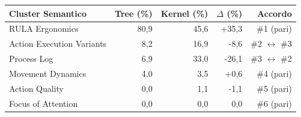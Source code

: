 \begin{tabular*}{\linewidth}{@{}l@{\extracolsep{\fill}}rrrr@{}}
\toprule
\textbf{Cluster Semantico} & \textbf{Tree (\%)} & \textbf{Kernel (\%)} & \textbf{$\Delta$ (\%)} & \textbf{Accordo} \\
\midrule
RULA Ergonomics & 80{,}9 & 45{,}6 & +35{,}3 & \#1 (pari) \\
Action Execution Variants & 8{,}2 & 16{,}9 & -8{,}6 & \#2 $\leftrightarrow$ \#3 \\
Process Log & 6{,}9 & 33{,}0 & -26{,}1 & \#3 $\leftrightarrow$ \#2 \\
Movement Dynamics & 4{,}0 & 3{,}5 & +0{,}6 & \#4 (pari) \\
Action Quality & 0{,}0 & 1{,}1 & -1{,}1 & \#5 (pari) \\
Focus of Attention & 0{,}0 & 0{,}0 & 0{,}0 & \#6 (pari) \\
\bottomrule
\end{tabular*}
